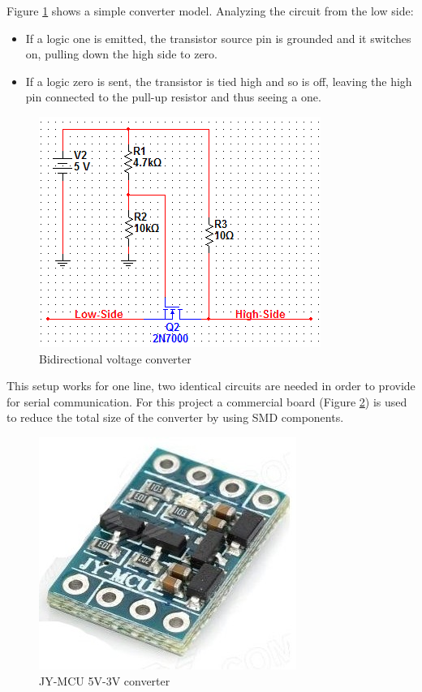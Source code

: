 		Figure \ref{figure:levelShifter} shows a simple converter model.
		Analyzing the circuit from the low side: 
			\begin{itemize}
			\item If a logic one is emitted, the transistor source pin is grounded and it switches on, pulling down the high side to zero.
			\item If a logic zero is sent, the transistor is tied high and so is off, leaving the high pin connected to the pull-up resistor and thus seeing a one.
			\end{itemize}

			\begin{figure}[H]
					\centering
					\includegraphics[scale=0.8]{images/ProjectComponents/level-converter-circuit.png}
					\caption{Bidirectional voltage converter}
					\label{figure:levelShifter}
			\end{figure}
			\bigskip

			This setup works for one line, two identical circuits are needed in order to provide for serial communication. For this project a commercial board (Figure \ref{level-converter}) is used to reduce the total size of the converter by using SMD components.

			\begin{figure}[H]
					\centering
					\includegraphics[scale=0.4]{images/ProjectComponents/logic-voltage.jpg}
					\caption{JY-MCU 5V-3V converter }
					\label{level-converter}
			\end{figure}
			\bigskip

